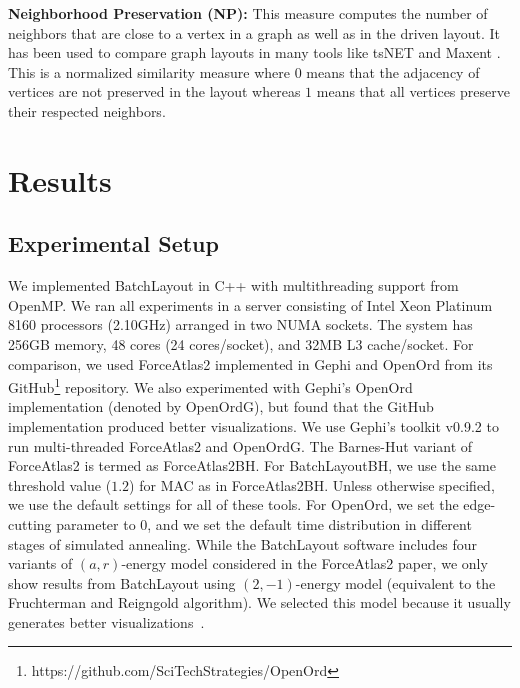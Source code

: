 \documentclass{vgtc}
\newcommand{\toolname}{{BatchLayout}}
\newcommand{\toolnameBH}{{BatchLayoutBH}}
\begin{document}
{\bf Neighborhood Preservation (NP): }
This measure computes the number of neighbors that are close to a vertex in a graph as well as in the driven layout. It has been used to compare graph layouts in many tools like tsNET \cite{kruiger2017graph} and Maxent \cite{gansner2012maxent}. This is a normalized similarity measure where $0$ means that the adjacency of vertices are not preserved in the layout whereas $1$ means that all vertices preserve their respected neighbors.

\section{Results}

\subsection{Experimental Setup}
We implemented \toolname{} in C++ with multithreading support from OpenMP.
We ran all experiments in a server consisting of Intel Xeon Platinum 8160 processors (2.10GHz) arranged in two NUMA sockets. 
The system has 256GB memory, 48 cores (24 cores/socket), and 32MB L3 cache/socket. 
For comparison, we used ForceAtlas2 implemented in Gephi and OpenOrd from its  GitHub\footnote{https://github.com/SciTechStrategies/OpenOrd} repository.
We also experimented with Gephi's OpenOrd implementation (denoted by OpenOrdG), but found that the GitHub implementation produced better visualizations. 
We use Gephi's toolkit v0.9.2 \cite{bastian2009gephi} to run multi-threaded ForceAtlas2 and OpenOrdG. 
The Barnes-Hut variant of ForceAtlas2 is termed as ForceAtlas2BH. 
For \toolnameBH{}, we use the same threshold value ($1.2$) for MAC as in ForceAtlas2BH. 
Unless otherwise specified, we use the default settings for all of these tools.
For OpenOrd, we set the edge-cutting parameter to $0$, and we set the default time distribution in different stages of simulated annealing. 
While the \toolname{} software includes four variants of $(a,r)$-energy model considered in the ForceAtlas2 paper, we only show results from \toolname{} using $(2,-1)$-energy model (equivalent to the Fruchterman and Reigngold algorithm).
We selected this model because it usually generates better visualizations~\cite{jacomy2014forceatlas2}.
\end{document}
